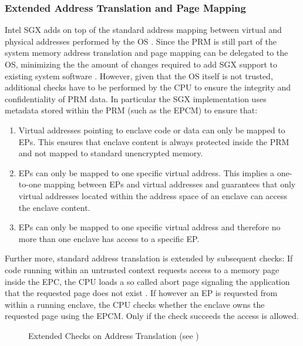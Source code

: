 \subsubsection{Extended Address Translation and Page Mapping}
\label{sec:AddressTranslation}
Intel SGX adds on top of the standard address mapping between virtual and physical addresses performed by the OS \cite{Costan2016IntelSE}. Since the PRM is still part of the
system memory address translation and page mapping can be delegated to the OS, minimizing the the amount of changes required to add SGX support to existing system software
\cite{IntelSGXSSLab}. However, given that the OS itself is not trusted, additional checks have to be performed by the CPU to ensure the integrity and confidentiality of PRM
data. In particular the SGX implementation uses metadata stored within the PRM (such as the EPCM) to ensure that:
\begin{enumerate}
    \item Virtual addresses pointing to enclave code or data can only be mapped to EPs. This ensures that enclave content is always protected inside the PRM and not mapped to
          standard unencrypted memory.
    \item EPs can only be mapped to one specific virtual address. This implies a one-to-one mapping between EPs and virtual addresses and guarantees that only virtual addresses
          located within the address space of an enclave can access the enclave content.
    \item EPs can only be mapped to one specific virtual address and therefore no more than one enclave has access to a specific EP.
\end{enumerate}
Further more, standard address translation is extended by subsequent checks: If code running within an untrusted context requests access to a memory page inside the EPC,
the CPU loads a so called abort page signaling the application that the requested page does not exist \cite{Costan2016IntelSE}. If however an EP is requested from within a
running enclave, the CPU checks whether the enclave owns the requested page using the EPCM. Only if the check succeeds the access is allowed.

\begin{figure}[h!]
    \centering
    \caption{Extended Checks on Address Translation (see \cite{IntelSGXExplanation})}
    \label{fig:pageCheck}
\end{figure}